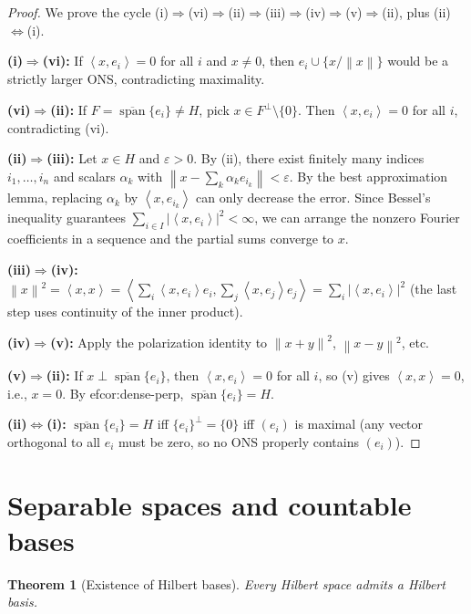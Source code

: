 \documentclass[a4paper,12pt]{book}
\DeclareMathOperator{\spn}{span}
\newcommand{\norm}[1]{\left\| #1 \right\|}
\newcommand{\abs}[1]{\left| #1 \right|}
\newcommand{\inner}[2]{\left\langle #1, #2 \right\rangle}
\theoremstyle{definition}
\theoremstyle{plain}
\newtheorem{theorem}[definition]{Theorem}
\theoremstyle{remark}
\begin{document}
\begin{proof}
We prove the cycle
(i)$\Rightarrow$(vi)$\Rightarrow$(ii)$\Rightarrow$(iii)$\Rightarrow$(iv)$\Rightarrow$(v)$\Rightarrow$(ii),
plus (ii)$\Leftrightarrow$(i).

\textbf{(i)$\Rightarrow$(vi):}  If $\inner{x}{e_i}=0$ for all $i$ and
$x\ne 0$, then $e_i\cup\{x/\norm{x}\}$ would be a strictly larger ONS,
contradicting maximality.

\textbf{(vi)$\Rightarrow$(ii):}  If $F=\overline{\spn}\{e_i\}\ne H$,
pick $x\in F^\perp\setminus\{0\}$.  Then $\inner{x}{e_i}=0$ for all $i$,
contradicting (vi).

\textbf{(ii)$\Rightarrow$(iii):}
Let $x\in H$ and $\varepsilon>0$.  By (ii), there exist finitely many
indices $i_1,\dots,i_n$ and scalars $\alpha_k$ with
$\norm{x-\sum_k\alpha_k e_{i_k}}<\varepsilon$.  By the best approximation
lemma, replacing $\alpha_k$ by $\inner{x}{e_{i_k}}$ can only decrease the
error.  Since Bessel's inequality guarantees
$\sum_{i\in I}\abs{\inner{x}{e_i}}^2<\infty$, we can arrange the nonzero
Fourier coefficients in a sequence and the partial sums converge to $x$.

\textbf{(iii)$\Rightarrow$(iv):}
$\norm{x}^2 = \inner{x}{x}
= \inner{\sum_i\inner{x}{e_i}e_i}{\sum_j\inner{x}{e_j}e_j}
= \sum_i\abs{\inner{x}{e_i}}^2$
(the last step uses continuity of the inner product).

\textbf{(iv)$\Rightarrow$(v):}
Apply the polarization identity to
$\norm{x+y}^2$, $\norm{x-y}^2$, etc.

\textbf{(v)$\Rightarrow$(ii):}
If $x\perp\overline{\spn}\{e_i\}$, then $\inner{x}{e_i}=0$ for all $i$,
so (v) gives $\inner{x}{x}=0$, i.e., $x=0$.  By 
ef{cor:dense-perp},
$\overline{\spn}\{e_i\}=H$.

\textbf{(ii)$\Leftrightarrow$(i):}
$\overline{\spn}\{e_i\}=H$ iff $\{e_i\}^\perp=\{0\}$ iff $(e_i)$ is
maximal (any vector orthogonal to all $e_i$ must be zero, so no ONS
properly contains $(e_i)$).
\end{proof}

\section{Separable spaces and countable bases}
\label{sec:separable}

\begin{theorem}[Existence of Hilbert bases]
\label{thm:ONB-exists}
Every Hilbert space admits a Hilbert basis.
\end{theorem}
\end{document}

